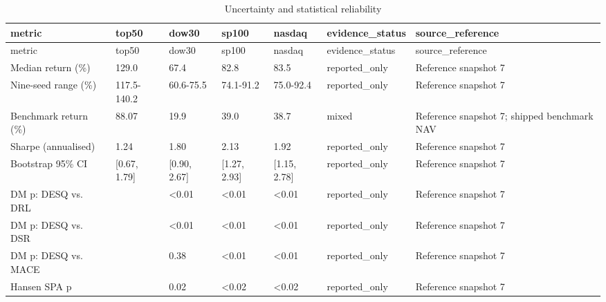 \begin{landscape}
\begin{longtable}{lllllll}
\caption{Uncertainty and statistical reliability}\label{tab:evaluation_7} \\
\toprule
metric & top50 & dow30 & sp100 & nasdaq & evidence\_status & source\_reference \\
\midrule
\endfirsthead
\toprule
metric & top50 & dow30 & sp100 & nasdaq & evidence\_status & source\_reference \\
\midrule
\endhead
Median return (\%) & 129.0 & 67.4 & 82.8 & 83.5 & reported\_only & Reference snapshot 7 \\
Nine-seed range (\%) & 117.5-140.2 & 60.6-75.5 & 74.1-91.2 & 75.0-92.4 & reported\_only & Reference snapshot 7 \\
Benchmark return (\%) & 88.07 & 19.9 & 39.0 & 38.7 & mixed & Reference snapshot 7; shipped benchmark NAV \\
Sharpe (annualised) & 1.24 & 1.80 & 2.13 & 1.92 & reported\_only & Reference snapshot 7 \\
Bootstrap 95\% CI & [0.67, 1.79] & [0.90, 2.67] & [1.27, 2.93] & [1.15, 2.78] & reported\_only & Reference snapshot 7 \\
DM p: DESQ vs. DRL &  & <0.01 & <0.01 & <0.01 & reported\_only & Reference snapshot 7 \\
DM p: DESQ vs. DSR &  & <0.01 & <0.01 & <0.01 & reported\_only & Reference snapshot 7 \\
DM p: DESQ vs. MACE &  & 0.38 & <0.01 & <0.01 & reported\_only & Reference snapshot 7 \\
Hansen SPA p &  & 0.02 & <0.02 & <0.02 & reported\_only & Reference snapshot 7 \\
\bottomrule
\end{longtable}
\end{landscape}
